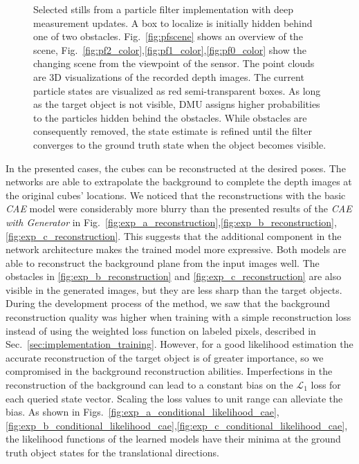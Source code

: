 \documentclass[letterpaper, 10 pt, journal, twoside]{ieeetran}  %
\begin{document}
\begin{figure*}[htp]
\begin{subfigure}[t]{0.24\textwidth}
		\label{fig:pf0}
	\end{subfigure}
	\caption{Selected stills from a particle filter implementation with deep measurement updates.
		A box to localize is initially hidden behind one of two obstacles. Fig.~\ref{fig:pfscene} shows an overview of the scene, Fig.~\ref{fig:pf2_color},\ref{fig:pf1_color},\ref{fig:pf0_color} show the changing scene from the viewpoint of the sensor.
		The point clouds are 3D visualizations of the recorded depth images. The current particle states are visualized as red semi-transparent boxes.
		As long as the target object is not visible, DMU assigns higher probabilities to the particles hidden behind the obstacles. While obstacles are consequently removed, the state estimate is refined until the filter converges to the ground truth state when the object becomes visible.}
	\label{fig:pf}
\end{figure*}
In the presented cases, the cubes can be reconstructed at the desired poses.
The networks are able to extrapolate the background to complete the depth images at the original cubes' locations.
We noticed that the reconstructions with the basic \textit{CAE} model were considerably more blurry than the presented results of the \textit{CAE with Generator} in Fig.~\ref{fig:exp_a_reconstruction},\ref{fig:exp_b_reconstruction},\ref{fig:exp_c_reconstruction}.
This suggests that the additional component in the network architecture makes the trained model more expressive.
Both models are able to reconstruct the background plane from the input images well. The obstacles in \ref{fig:exp_b_reconstruction} and \ref{fig:exp_c_reconstruction} are also visible in the generated images, but they are less sharp than the target objects. During the development process of the method, we saw that the background reconstruction quality was higher when training with a simple reconstruction loss instead of using the weighted loss function on labeled pixels, described in Sec.~\ref{sec:implementation_training}. However, for a good likelihood estimation the accurate reconstruction of the target object is of greater importance, so we compromised in the background reconstruction abilities.
Imperfections in the reconstruction of the background can lead to a constant bias on the $\mathcal{L}_1$ loss for each queried state vector. Scaling the loss values to unit range can alleviate the bias.
As shown in Figs.~\ref{fig:exp_a_conditional_likelihood_cae},\ref{fig:exp_b_conditional_likelihood_cae},\ref{fig:exp_c_conditional_likelihood_cae}, the likelihood functions of the learned models have their minima at the ground truth object states for the translational directions.
\end{document}
